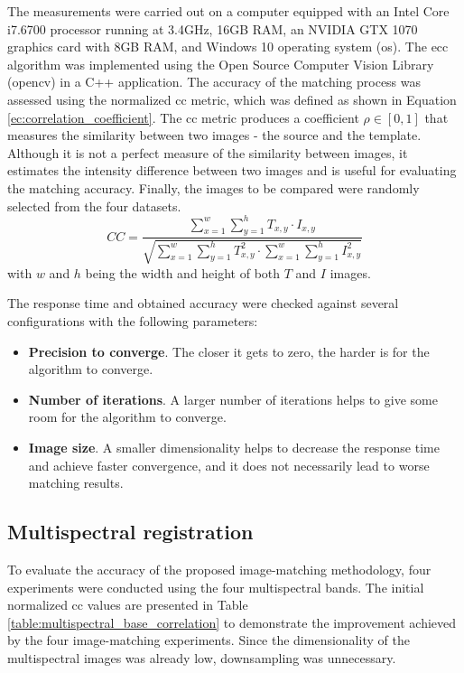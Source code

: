 The measurements were carried out on a computer equipped with an Intel Core i7.6700 processor running at 3.4GHz, 16GB RAM, an NVIDIA GTX 1070 graphics card with 8GB RAM, and Windows 10 operating system (\acrshort{os}). The \acrshort{ecc} algorithm was implemented using the Open Source Computer Vision Library (\acrshort{opencv}) in a C++ application. The accuracy of the matching process was assessed using the normalized \acrshort{cc} metric, which was defined as shown in Equation \ref{ec:correlation_coefficient}. The \acrshort{cc} metric produces a coefficient $\rho \in [0, 1]$ that measures the similarity between two images - the source and the template. Although it is not a perfect measure of the similarity between images, it estimates the intensity difference between two images and is useful for evaluating the matching accuracy. Finally, the images to be compared were randomly selected from the four datasets.
\begin{equation}
    \label{ec:correlation_coefficient}
    \textit{CC} = \frac{\sum_{x=1}^{w} \sum_{y=1}^{h} T_{x,y} \cdot I_{x,y}}{\sqrt{\sum_{x=1}^{w} \sum_{y=1}^{h} T_{x,y}^{2} \cdot \sum_{x=1}^{w} \sum_{y=1}^{h} I_{x,y}^{2}}}
\end{equation}
with $w$ and $h$ being the width and height of both $T$ and $I$ images.

The response time and obtained accuracy were checked against several configurations with the following parameters: 
\begin{itemize}
    \item \textbf{Precision to converge}. The closer it gets to zero, the harder is for the algorithm to converge.
    \item \textbf{Number of iterations}. A larger number of iterations helps to give some room for the algorithm to converge. 
    \item \textbf{Image size}. A smaller dimensionality helps to decrease the response time and achieve faster convergence, and it does not necessarily lead to worse matching results. 
\end{itemize}

\subsection{Multispectral registration}

To evaluate the accuracy of the proposed image-matching methodology, four experiments were conducted using the four multispectral bands. The initial normalized \acrshort{cc} values are presented in Table \ref{table:multispectral_base_correlation} to demonstrate the improvement achieved by the four image-matching experiments. Since the dimensionality of the multispectral images was already low, downsampling was unnecessary.

